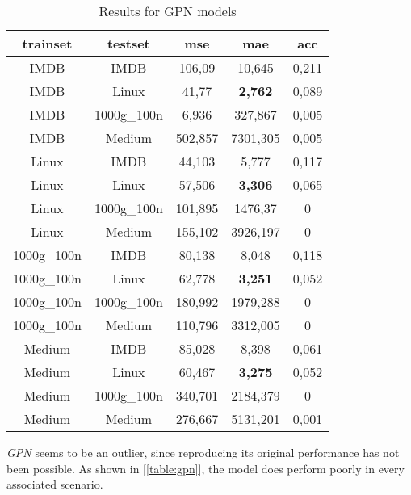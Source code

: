 \documentclass[../Thesis.tex]{subfiles}
\begin{document}
	\begin{table}[H]
		\centering
		\setlength\tabcolsep{4pt}
		\renewcommand{\arraystretch}{1.2}
		\begin{tabular}{c|c|c|c|c}
			\toprule
			\textbf{trainset} & \textbf{testset} & \textbf{mse} & \textbf{mae} & \textbf{acc} \\
			\midrule
IMDB & IMDB & 106,09 & 10,645 & 0,211 \\
IMDB & Linux & 41,77 & \textbf{2,762} & 0,089 \\
IMDB & 1000g\_100n & 6,936 & 327,867 & 0,005 \\
IMDB & Medium & 502,857 & 7301,305 & 0,005 \\ \midrule
Linux & IMDB & 44,103 & 5,777 & 0,117 \\
Linux & Linux & 57,506 & \textbf{3,306} & 0,065 \\
Linux & 1000g\_100n & 101,895 & 1476,37 & 0 \\
Linux & Medium & 155,102 & 3926,197 & 0 \\ \midrule
1000g\_100n & IMDB & 80,138 & 8,048 & 0,118 \\
1000g\_100n & Linux & 62,778 & \textbf{3,251} & 0,052 \\
1000g\_100n & 1000g\_100n & 180,992 & 1979,288 & 0 \\
1000g\_100n & Medium & 110,796 & 3312,005 & 0 \\ \midrule
Medium & IMDB & 85,028 & 8,398 & 0,061 \\
Medium & Linux & 60,467 & \textbf{3,275} & 0,052 \\
Medium & 1000g\_100n & 340,701 & 2184,379 & 0 \\
Medium & Medium & 276,667 & 5131,201 & 0,001 \\
			\bottomrule
		\end{tabular}
		\caption{Results for GPN models}
		\label{table:gpn}
	\end{table}
	
	\emph{GPN} seems to be an outlier, since reproducing its original performance has not been possible. As shown in [\autoref{table:gpn}], the model does perform poorly in every associated scenario.
	
\end{document}
